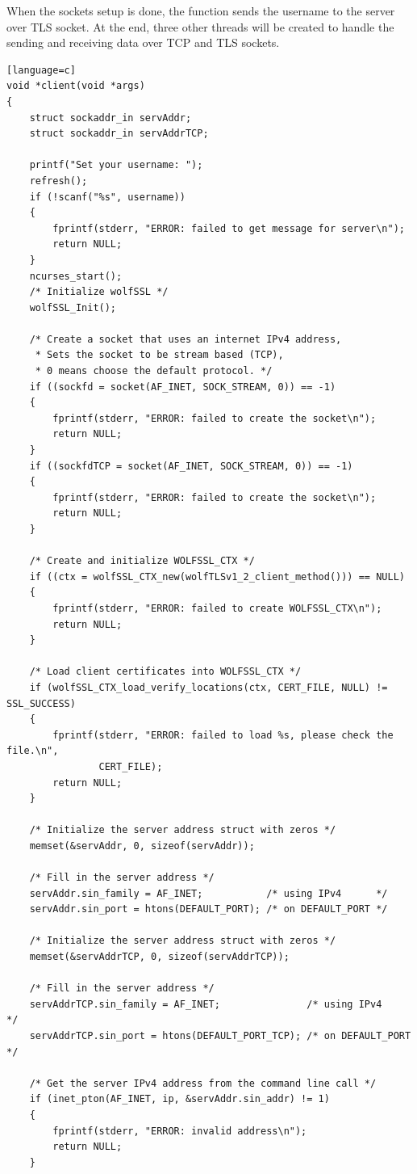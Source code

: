\documentclass[a4paper,12pt]{article}
\begin{document}
When the sockets setup is done, the function sends the username to the server over TLS socket. At the end, three other threads will be created to handle the sending and receiving data over TCP and TLS sockets.
\begin{lstlisting}[caption={void *client(void*args) of TLS client},captionpos=b][language=c]
void *client(void *args)
{
    struct sockaddr_in servAddr;
    struct sockaddr_in servAddrTCP;

    printf("Set your username: ");
    refresh();
    if (!scanf("%s", username))
    {
        fprintf(stderr, "ERROR: failed to get message for server\n");
        return NULL;
    }
    ncurses_start();
    /* Initialize wolfSSL */
    wolfSSL_Init();

    /* Create a socket that uses an internet IPv4 address,
     * Sets the socket to be stream based (TCP),
     * 0 means choose the default protocol. */
    if ((sockfd = socket(AF_INET, SOCK_STREAM, 0)) == -1)
    {
        fprintf(stderr, "ERROR: failed to create the socket\n");
        return NULL;
    }
    if ((sockfdTCP = socket(AF_INET, SOCK_STREAM, 0)) == -1)
    {
        fprintf(stderr, "ERROR: failed to create the socket\n");
        return NULL;
    }

    /* Create and initialize WOLFSSL_CTX */
    if ((ctx = wolfSSL_CTX_new(wolfTLSv1_2_client_method())) == NULL)
    {
        fprintf(stderr, "ERROR: failed to create WOLFSSL_CTX\n");
        return NULL;
    }

    /* Load client certificates into WOLFSSL_CTX */
    if (wolfSSL_CTX_load_verify_locations(ctx, CERT_FILE, NULL) != SSL_SUCCESS)
    {
        fprintf(stderr, "ERROR: failed to load %s, please check the file.\n",
                CERT_FILE);
        return NULL;
    }

    /* Initialize the server address struct with zeros */
    memset(&servAddr, 0, sizeof(servAddr));

    /* Fill in the server address */
    servAddr.sin_family = AF_INET;           /* using IPv4      */
    servAddr.sin_port = htons(DEFAULT_PORT); /* on DEFAULT_PORT */

    /* Initialize the server address struct with zeros */
    memset(&servAddrTCP, 0, sizeof(servAddrTCP));

    /* Fill in the server address */
    servAddrTCP.sin_family = AF_INET;               /* using IPv4      */
    servAddrTCP.sin_port = htons(DEFAULT_PORT_TCP); /* on DEFAULT_PORT */

    /* Get the server IPv4 address from the command line call */
    if (inet_pton(AF_INET, ip, &servAddr.sin_addr) != 1)
    {
        fprintf(stderr, "ERROR: invalid address\n");
        return NULL;
    }


\end{lstlisting}
\end{document}
